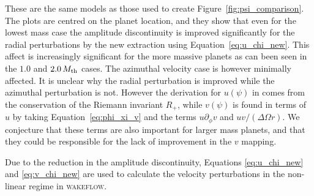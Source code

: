 These are the same models as those used to create Figure~\ref{fig:psi_comparison}. 
The plots are centred on the planet location, and they show that even for the lowest mass case the amplitude discontinuity is improved significantly for the radial perturbations by the new extraction using Equation~\eqref{eq:u_chi_new}. 
This affect is increasingly significant for the more massive planets as can been seen in the $1.0$ and $2.0 \, M_{\rm th}$ cases. The azimuthal velocity case is however minimally affected. 
It is unclear why the radial perturbation is improved while the azimuthal perturbation is not.
However the derivation for $u(\psi)$ in \citet{rafikov2002a} comes from the conservation of the Riemann invariant $R_+$, while $v(\psi)$ is found in terms of $u$ by taking Equation~\eqref{eq:phi_xi_v} and the terms $u \partial_\phi v$ and $u v / (\Delta \Omega r)$.
We conjecture that these terms are also important for larger mass planets, and that they could be responsible for the lack of improvement in the $v$ mapping.

Due to the reduction in the amplitude discontinuity, Equations \eqref{eq:u_chi_new} and \eqref{eq:v_chi_new} are used to calculate the velocity perturbations in the non-linear regime in \textsc{wakeflow}. 

